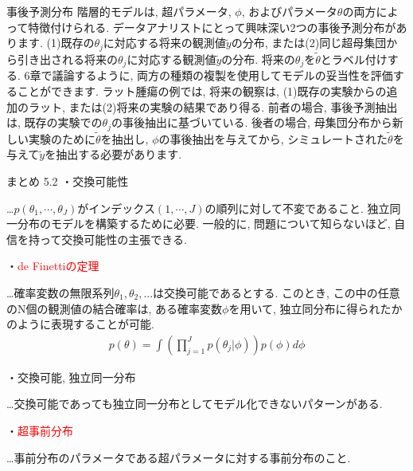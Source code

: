\documentclass[10pt,dvipdfmx,a4]{beamer}
\newcommand{\eqn}[1]{\begin{align*}#1\end{align*}}
\newcommand{\tcr}[1]{\textcolor{red}{#1}}
\begin{document}

\begin{frame}{事後予測分布}
階層的モデルは, 超パラメータ, $\phi$, およびパラメータ$\theta$の両方によって特徴付けられる.
データアナリストにとって興味深い2つの事後予測分布があります.
(1)既存の$\theta_j$に対応する将来の観測値$\tilde{y}$の分布, または(2)同じ超母集団から引き出される将来の$\theta_j$に対応する観測値$\tilde{y}$の分布.
将来の$\theta_j$を$\tilde{\theta}$とラベル付けする.
6章で議論するように, 両方の種類の複製を使用してモデルの妥当性を評価することができます.
ラット腫瘍の例では, 将来の観察は, (1)既存の実験からの追加のラット, または(2)将来の実験の結果であり得る.
前者の場合, 事後予測抽出は, 既存の実験での$\theta_j$の事後抽出に基づいている.
後者の場合, 母集団分布から新しい実験のために$\tilde{\theta}$を抽出し, $\phi$の事後抽出を与えてから, シミュレートされた$\tilde{\theta}$を与えて$\tilde{y}$を抽出する必要があります.
\end{frame}


\begin{frame}[t]{まとめ 5.2}
・交換可能性

…$p(\theta_1,\cdots,\theta_J)$がインデックス$(1,\cdots,J)$の順列に対して不変であること.
独立同一分布のモデルを構築するために必要.
一般的に, 問題について知らないほど, 自信を持って交換可能性の主張できる.

・\tcr{de Finettiの定理}

…確率変数の無限系列$\theta_1,\theta_2,\dots$は交換可能であるとする.
このとき, この中の任意のN個の観測値の結合確率は, ある確率変数$\phi$を用いて, 独立同分布に得られたかのように表現することが可能.
\eqn{p(\theta)=\int \left(\prod_{j=1}^Jp(\theta_j|\phi)\right)p(\phi)d\phi}

・交換可能, 独立同一分布

…交換可能であっても独立同一分布としてモデル化できないパターンがある.

・\tcr{超事前分布}

…事前分布のパラメータである超パラメータに対する事前分布のこと.
\end{frame}

\end{document}
